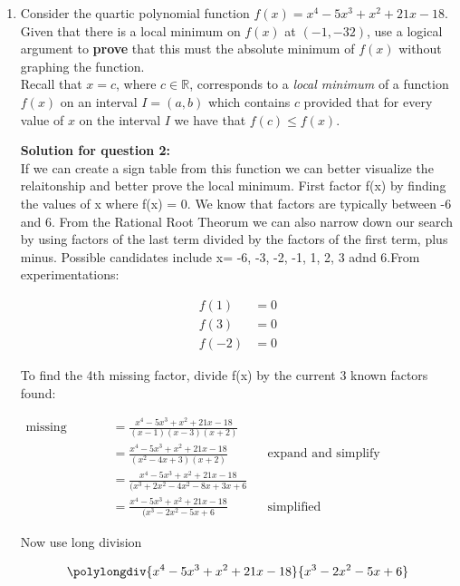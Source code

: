 \documentclass[12pt]{book}
\begin{document}
\begin{enumerate}
\item Consider the quartic polynomial function $f(x) = x^4 - 5x^3 + x^2 + 21x - 18$. Given that there is a local minimum on $f(x)$ at $(-1,-32)$, use a logical argument to \textbf{prove} that this must the absolute minimum of $f(x)$ without graphing the function. \\

Recall that $x=c$, where $c \in \mathbb{R}$, corresponds to a \emph{local minimum} of a function $f(x)$ on an interval $I = (a,b)$ which contains $c$ provided that for every value of $x$ on the interval $I$ we have that $f(c) \le f(x)$.

\vspace{0.3cm} 
\textbf{Solution for question 2:}\\
 If we can create a sign table from this function we can better visualize 
 the relaitonship and better prove the local minimum. First factor f(x) by 
 finding the values of x where f(x) = 0. We know that factors are typically between
 -6 and 6. From the Rational Root Theorum we can also narrow down our search by using
 factors of the last term divided by the factors of the first term, plus minus. Possible 
 candidates include x= -6, -3, -2, -1, 1, 2, 3 adnd 6.From experimentations:

 \vspace{-0.8cm}
 \begin{align*}
    f(1) &= 0 \\
    f(3) &= 0 \\
    f(-2) &= 0
 \end{align*}

To find the 4th missing factor, divide f(x) by the current 3 known factors found:

\begin{align*}
    \text{missing factor} &= \frac{x^4 - 5x^3 + x^2 + 21x - 18}{(x-1)(x-3)(x+2)} \\
    &= \frac{x^4 - 5x^3 + x^2 + 21x - 18}{(x^2-4x+3)(x+2)} && \text{expand and simplify denominator}\\
    &= \frac{x^4 - 5x^3 + x^2 + 21x - 18}{(x^3+2x^2-4x^2-8x+3x+6} \\
    &= \frac{x^4 - 5x^3 + x^2 + 21x - 18}{(x^3-2x^2-5x+6} && \text{simplified}
\end{align*}

\vspace{0.2cm}
\begin{center}
    Now use long division
\end{center}
\vspace{-0.5cm}
$$\polylongdiv{x^4 - 5x^3 + x^2 + 21x - 18}{x^3-2x^2-5x+6}$$


\end{enumerate}
\end{document}
